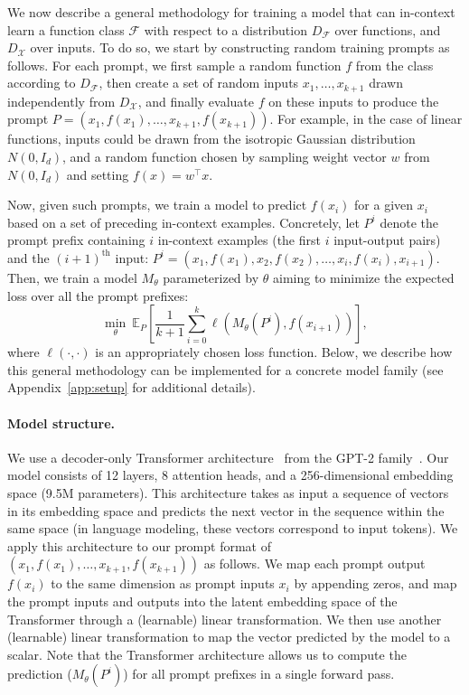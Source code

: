 We now describe a general methodology for training a model that can in-context learn a function class $\mathcal{F}$ with respect to a distribution $D_{\mathcal{F}}$ over functions, and $D_\mathcal{X}$ over inputs. To do so, we start by constructing random training prompts as follows.
For each prompt, we first sample a random function $f$ from the class according to $D_{\mathcal{F}}$, then create a set of random inputs $x_1, \ldots, x_{k+1}$ drawn independently from  $D_{\mathcal{X}}$, and finally evaluate $f$ on these inputs to produce the prompt
$P = (x_1, f(x_1), \ldots, x_{k+1}, f(x_{k+1}))$.
For example, in the case of linear functions, inputs could be drawn from the isotropic Gaussian distribution $N(0, I_d)$, and a random function chosen by sampling weight vector $w$ from $N(0, I_d)$ and setting $f(x) = w^\top x$.

Now, given such prompts, we train a model to predict $f(x_i)$ for a given $x_i$ based on a set of preceding in-context examples.
Concretely, let $P^{i}$ denote the prompt prefix containing $i$ in-context examples (the first $i$ input-output pairs) and the $(i+1)^{\text{th}}$ input: $P^i = (x_1, f(x_1), x_2, f(x_2), \ldots, x_{i}, f(x_{i}), x_{i+1})$. 
Then, we train a model $M_\theta$ parameterized by $\theta$ aiming to minimize the expected loss over all the prompt prefixes:
\begin{equation}
\min_\theta \ 
\mathds{E}_{P}\left[\frac{1}{k+1}
\sum_{i=0}^k \ell\left(M_\theta\left(P^i\right), f\left(x_{i+1}\right)\right) 
\right],
\label{eq:training_objective}
\end{equation}
where $\ell(\cdot, \cdot)$ is an appropriately chosen loss function.
Below, we describe how this general methodology can be implemented for a concrete model family (see Appendix~\ref{app:setup} for additional details).

\paragraph{Model structure.}
We use a decoder-only Transformer architecture~\citep{vaswani2017attention} from the GPT-2 family~\citep{radford2019language}. 
Our model consists of 12 layers, 8 attention heads, and a 256-dimensional embedding space (9.5M parameters).
This architecture takes as input a sequence of vectors in its embedding space and predicts the next vector in the sequence within the same space (in language modeling, these vectors correspond to input tokens).
We apply this architecture to our prompt format of $(x_1,f(x_1),\ldots,x_{k+1},f(x_{k+1}))$ as follows.
We map each prompt output $f(x_i)$ to the same dimension as prompt inputs $x_i$ by appending zeros, and map the prompt inputs and outputs into the latent embedding space of the Transformer through a (learnable) linear transformation.
We then use another (learnable) linear transformation to map the vector predicted by the model to a scalar.
Note that the Transformer architecture allows us to compute the prediction ($M_\theta(P^i)$) for all prompt prefixes in a single forward pass.

